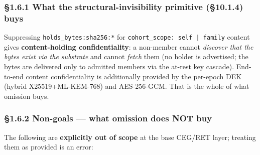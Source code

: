 \documentclass[11pt]{article}
\begin{document}
\subsubsection*{§1.6.1 What the structural-invisibility primitive (§10.1.4) buys}

Suppressing \texttt{holds\_bytes:sha256:*} for \texttt{cohort\_scope: self | family} content gives \textbf{content-holding confidentiality}: a non-member cannot \textit{discover that the bytes exist via the substrate} and cannot \textit{fetch} them (no holder is advertised; the bytes are delivered only to admitted members via the at-rest key cascade). End-to-end content confidentiality is additionally provided by the per-epoch DEK (hybrid X25519+ML-KEM-768) and AES-256-GCM. That is the whole of what omission buys.


\subsubsection*{§1.6.2 Non-goals — what omission does NOT buy}

The following are \textbf{explicitly out of scope} at the base CEG/RET layer; treating them as provided is an error:
\end{document}
